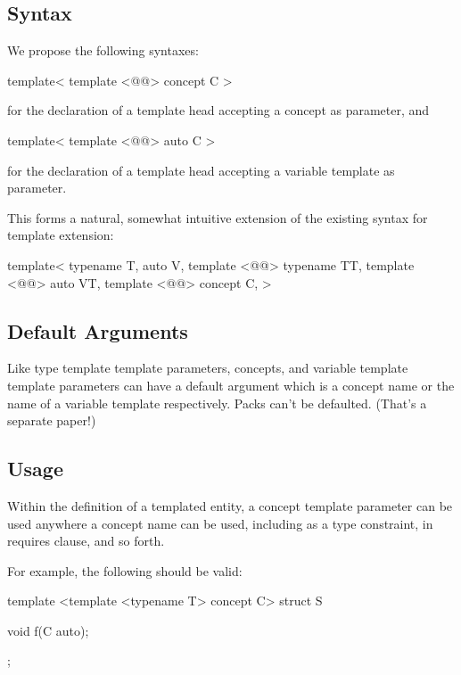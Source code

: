 \documentclass{wg21}
\begin{document}
\subsection{Syntax}

We propose the following syntaxes:

\begin{colorblock}
template<
    template <@@> concept C
>
\end{colorblock}

for the declaration of a template head accepting a concept as parameter, and

\begin{colorblock}
template<
    template <@@> auto C
>
\end{colorblock}

for the declaration of a template head accepting a variable template as parameter.

This forms a natural, somewhat intuitive extension of the existing syntax for template extension:
\begin{colorblock}
template<
    typename T,
    auto V,
    template <@@> typename TT,
    template <@@> auto VT,
    template <@@> concept C,
>
\end{colorblock}

\subsection{Default Arguments}


Like type template template parameters, concepts, and variable template template
parameters can have a default argument which is a concept name or the name of a variable template respectively.
Packs can't be defaulted. (That's a separate paper!)

\subsection{Usage}

Within the definition of a templated entity, a concept template parameter
can be used anywhere a concept name can be used, including as a type constraint, in requires clause, and so forth.

For example, the following should be valid:

\begin{colorblock}
template <template <typename T> concept C>
struct S {
    void f(C auto);

};
\end{colorblock}
\end{document}

